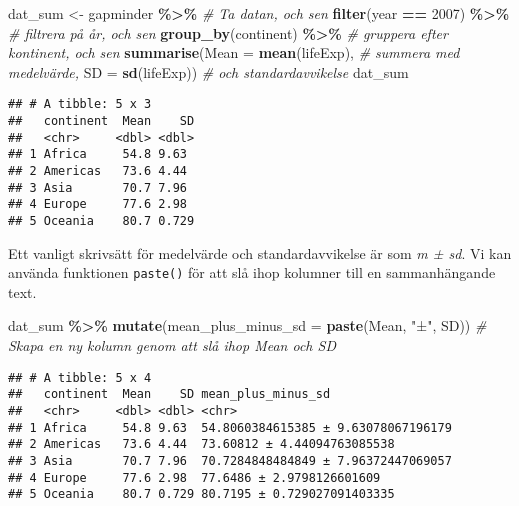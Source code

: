 \documentclass[
]{book}
\newenvironment{Shaded}{\begin{snugshade}}{\end{snugshade}}
\newcommand{\AttributeTok}[1]{\textcolor[rgb]{0.13,0.29,0.53}{#1}}
\newcommand{\CommentTok}[1]{\textcolor[rgb]{0.56,0.35,0.01}{\textit{#1}}}
\newcommand{\DecValTok}[1]{\textcolor[rgb]{0.00,0.00,0.81}{#1}}
\newcommand{\FunctionTok}[1]{\textcolor[rgb]{0.13,0.29,0.53}{\textbf{#1}}}
\newcommand{\NormalTok}[1]{#1}
\newcommand{\OtherTok}[1]{\textcolor[rgb]{0.56,0.35,0.01}{#1}}
\newcommand{\SpecialCharTok}[1]{\textcolor[rgb]{0.81,0.36,0.00}{\textbf{#1}}}
\newcommand{\StringTok}[1]{\textcolor[rgb]{0.31,0.60,0.02}{#1}}
\theoremstyle{definition}
\theoremstyle{definition}
\theoremstyle{definition}
\theoremstyle{definition}
\theoremstyle{remark}
\begin{document}
\begin{Shaded}
\begin{Highlighting}[]
\NormalTok{dat\_sum }\OtherTok{\textless{}{-}}\NormalTok{ gapminder }\SpecialCharTok{\%\textgreater{}\%}                         \CommentTok{\# Ta datan, och sen}
  \FunctionTok{filter}\NormalTok{(year }\SpecialCharTok{==} \DecValTok{2007}\NormalTok{) }\SpecialCharTok{\%\textgreater{}\%}                       \CommentTok{\# filtrera på år, och sen}
  \FunctionTok{group\_by}\NormalTok{(continent) }\SpecialCharTok{\%\textgreater{}\%}                        \CommentTok{\# gruppera efter kontinent, och sen}
  \FunctionTok{summarise}\NormalTok{(}\AttributeTok{Mean =} \FunctionTok{mean}\NormalTok{(lifeExp),                }\CommentTok{\# summera med medelvärde,}
            \AttributeTok{SD =} \FunctionTok{sd}\NormalTok{(lifeExp))                    }\CommentTok{\# och standardavvikelse}
\NormalTok{dat\_sum}
\end{Highlighting}
\end{Shaded}

\begin{verbatim}
## # A tibble: 5 x 3
##   continent  Mean    SD
##   <chr>     <dbl> <dbl>
## 1 Africa     54.8 9.63 
## 2 Americas   73.6 4.44 
## 3 Asia       70.7 7.96 
## 4 Europe     77.6 2.98 
## 5 Oceania    80.7 0.729
\end{verbatim}

Ett vanligt skrivsätt för medelvärde och standardavvikelse är som \emph{m ± sd}. Vi kan använda funktionen \texttt{paste()} för att slå ihop kolumner till en sammanhängande text.

\begin{Shaded}
\begin{Highlighting}[]
\NormalTok{dat\_sum }\SpecialCharTok{\%\textgreater{}\%} 
  \FunctionTok{mutate}\NormalTok{(}\AttributeTok{mean\_plus\_minus\_sd =} \FunctionTok{paste}\NormalTok{(Mean, }\StringTok{"±"}\NormalTok{, SD))        }\CommentTok{\# Skapa en ny kolumn genom att slå ihop Mean och SD}
\end{Highlighting}
\end{Shaded}

\begin{verbatim}
## # A tibble: 5 x 4
##   continent  Mean    SD mean_plus_minus_sd                 
##   <chr>     <dbl> <dbl> <chr>                              
## 1 Africa     54.8 9.63  54.8060384615385 ± 9.63078067196179
## 2 Americas   73.6 4.44  73.60812 ± 4.44094763085538        
## 3 Asia       70.7 7.96  70.7284848484849 ± 7.96372447069057
## 4 Europe     77.6 2.98  77.6486 ± 2.9798126601609          
## 5 Oceania    80.7 0.729 80.7195 ± 0.729027091403335
\end{verbatim}
\end{document}
